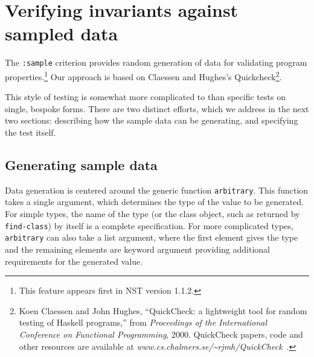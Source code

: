
\section{Verifying invariants against sampled data}
\label{quickcheck}
The \texttt{:sample} criterion provides random generation of data for
validating program properties.\footnote{This feature appears first in
  NST version 1.1.2.}  Our approach is based on Claessen and Hughes's
Quickcheck\footnote{Koen Claessen and John Hughes, ``QuickCheck: a
  lightweight tool for random testing of Haskell programs,'' from
  \emph{Proceedings of the International Conference on Functional
    Programming}, 2000.  QuickCheck papers, code and other resources
  are available at \textsl{www.cs.chalmers.se/\~{}rjmh/QuickCheck}~.}.

This style of testing is somewhat more complicated to than specific
tests on single, bespoke forms.  There are two distinct efforts, which
we address in the next two sections: describing how the sample data
can be generating, and specifying the test itself.

\subsection{Generating sample data}
Data generation is centered around the generic function
\texttt{arbitrary}.  This function takes a single argument, which
determines the type of the value to be generated.  For simple types,
the name of the type (or the class object, such as returned by
\texttt{find-class}) by itself is a complete specification.  For more
complicated types, \texttt{arbitrary} can also take a list argument,
where the first element gives the type and the remaining elements are
keyword argument providing additional requirements for the generated
value.

